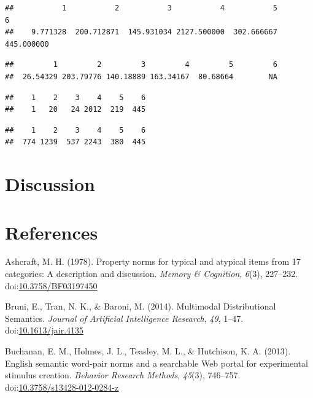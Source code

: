\documentclass[man]{apa6}
\begin{document}
\begin{verbatim}
##           1           2           3           4           5           6 
##    9.771328  200.712871  145.931034 2127.500000  302.666667  445.000000
\end{verbatim}

\begin{verbatim}
##         1         2         3         4         5         6 
##  26.54329 203.79776 140.18889 163.34167  80.68664        NA
\end{verbatim}

\begin{verbatim}
##    1    2    3    4    5    6 
##    1   20   24 2012  219  445
\end{verbatim}

\begin{verbatim}
##    1    2    3    4    5    6 
##  774 1239  537 2243  380  445
\end{verbatim}

\hypertarget{discussion}{%
\section{Discussion}\label{discussion}}

\newpage

\hypertarget{references}{%
\section{References}\label{references}}

\begingroup
\setlength{\parindent}{-0.5in}
\setlength{\leftskip}{0.5in}

\hypertarget{refs}{}
\leavevmode\hypertarget{ref-Ashcraft1978a}{}%
Ashcraft, M. H. (1978). Property norms for typical and atypical items from 17 categories: A description and discussion. \emph{Memory \& Cognition}, \emph{6}(3), 227--232. doi:\href{https://doi.org/10.3758/BF03197450}{10.3758/BF03197450}

\leavevmode\hypertarget{ref-Bruni2014}{}%
Bruni, E., Tran, N. K., \& Baroni, M. (2014). Multimodal Distributional Semantics. \emph{Journal of Artificial Intelligence Research}, \emph{49}, 1--47. doi:\href{https://doi.org/10.1613/jair.4135}{10.1613/jair.4135}

\leavevmode\hypertarget{ref-Buchanan2013}{}%
Buchanan, E. M., Holmes, J. L., Teasley, M. L., \& Hutchison, K. A. (2013). English semantic word-pair norms and a searchable Web portal for experimental stimulus creation. \emph{Behavior Research Methods}, \emph{45}(3), 746--757. doi:\href{https://doi.org/10.3758/s13428-012-0284-z}{10.3758/s13428-012-0284-z}
\end{document}
